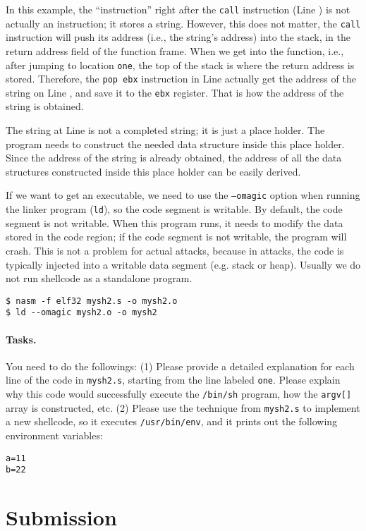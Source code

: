In this example, the ``instruction'' right after the 
\texttt{call} instruction (Line ) is not actually an instruction; 
it stores a string. However, this does not matter, the
\texttt{call} instruction will push its address (i.e.,
the string's address) into the stack, in the return
address field of the function frame. When we 
get into the function, i.e., after jumping to 
location \texttt{one}, the top of the stack 
is where the return address is stored. Therefore,
the \texttt{pop ebx} instruction in Line  actually
get the address of the string on Line , 
and save it to the \texttt{ebx} register. That is how the 
address of the string is obtained. 


The string at Line  is not a completed string; it 
is just a place holder. 
The program needs to construct the needed data structure
inside this place holder. Since the address of the string
is already obtained, the address of all the data 
structures constructed inside this place holder can
be easily derived. 


If we want to get an executable, we need to use 
the \texttt{--omagic} option when running the 
linker program (\texttt{ld}), so 
the code segment is writable. 
By default, the code segment is not writable.
When this program runs, it needs to modify the data stored
in the code region; if the code segment is not 
writable, the program will crash. 
This is not a problem for actual attacks, because
in attacks, the code is typically injected into a writable data 
segment (e.g. stack or heap). Usually we do not run shellcode 
as a standalone program. 


\begin{lstlisting}
$ nasm -f elf32 mysh2.s -o mysh2.o
$ ld --omagic mysh2.o -o mysh2
\end{lstlisting}


\paragraph{Tasks.} You need to do the followings:
(1) Please provide a detailed explanation for each line of the 
code in \texttt{mysh2.s}, starting from the line labeled \texttt{one}.
Please explain why this code would successfully execute 
the \texttt{/bin/sh} program, how the \texttt{argv[]} array is
constructed, etc. 
(2) Please use the technique from \texttt{mysh2.s} to 
implement a new shellcode, so it 
executes \texttt{/usr/bin/env}, and it prints out 
the following environment variables: 

\begin{lstlisting}
a=11
b=22
\end{lstlisting}



\section{Submission}

\seedsubmission













